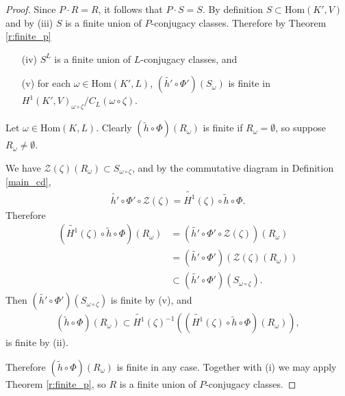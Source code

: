 \begin{proof}
Since $P \cdot R = R$, it follows that $P\cdot S = S$. By definition $S \subset \mathrm{Hom}(K', V)$ and by (iii) $S$ is a finite union of $P$-conjugacy classes. Therefore by Theorem \ref{r:finite_p}
\begin{itemize}
	\item[(iv)] $S^L$ is a finite union of $L$-conjugacy classes, and
	\item[(v)] for each $\omega \in \mathrm{Hom}(K', L)$, $(\widetilde{h'} \circ \Phi')\left(S_\omega\right)$ is finite in $H^1(K', V)_{\omega\circ\zeta}/C_L(\omega\circ\zeta)$.
\end{itemize}

Let $\omega \in \mathrm{Hom}(K, L)$. Clearly $(\widetilde{h} \circ \Phi)\left(R_\omega\right)$ is finite if $R_\omega = \emptyset$, so suppose $R_\omega \neq \emptyset$. 

We have $\mathcal{Z}(\zeta)(R_\omega) \subset S_{\omega\circ\zeta}$, and by the commutative diagram in Definition \ref{main_cd},
\begin{align*}
	\widetilde{h'} \circ \Phi' \circ \mathcal{Z}(\zeta) = \widetilde{H^1}(\zeta) \circ \widetilde{h} \circ \Phi.
\end{align*}
Therefore
\begin{align*}
	\left(\widetilde{H^1}(\zeta) \circ \widetilde{h} \circ \Phi\right)(R_\omega) &= \left(\widetilde{h'} \circ \Phi' \circ \mathcal{Z}(\zeta)\right)(R_\omega) \\
		&= (\widetilde{h'} \circ \Phi')\left(\mathcal{Z}(\zeta)(R_\omega)\right) \\
		&\subset (\widetilde{h'} \circ \Phi')(S_{\omega\circ\zeta}).
\end{align*}
Then $\left(\widetilde{h'} \circ \Phi'\right)(S_{\omega\circ\zeta})$ is finite by (v), and
\begin{align*}
	(\widetilde{h} \circ \Phi)(R_\omega) \subset \widetilde{H^1}(\zeta)^{-1} \left(\left(\widetilde{H^1}(\zeta) \circ \widetilde{h} \circ \Phi\right)(R_\omega)\right),
\end{align*}
is finite by (ii).

Therefore $(\widetilde{h} \circ \Phi)(R_\omega)$ is finite in any case. Together with (i) we may apply Theorem \ref{r:finite_p}, so $R$ is a finite union of $P$-conjugacy classes.
\end{proof}

